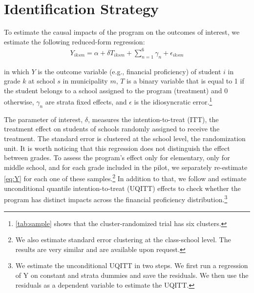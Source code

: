 \section{Identification Strategy} \label{sec:identification}

To estimate the causal impacts of the program on the outcomes of interest, we estimate the following reduced-form regression:
\begin{align} 
     Y_{iksm}= \alpha + \delta T_{iksm} + \sum_{n=1}^{6} \gamma_n  + \epsilon_{iksm} 
     \label{eq:Y}
\end {align}

\noindent

in which $Y$ is the outcome variable (e.g., financial proficiency) of student $i$ in grade $k$ at school $s$ in municipality $m$, $T$ is a binary variable that is equal to 1 if the student belongs to a school assigned to the program (treatment) and 0 otherwise, $\gamma_n$ are strata fixed effects, and $\epsilon$ is the idiosyncratic error.\footnote{\autoref{tab:sample} shows that the cluster-randomized trial has six clusters.}

The parameter of interest, $\delta$, measures the intention-to-treat (ITT), the treatment effect on students of schools randomly assigned to receive the treatment. The standard error is clustered at the school level, the randomization unit. It is worth noticing that this regression does not distinguish the effect between grades. To assess the program's effect only for elementary, only for middle school, and for each grade included in the pilot, we separately re-estimate \autoref{eq:Y} for each one of these samples.\footnote {We also estimate standard error clustering at the class-school level. The results are very similar and are available upon request.} In addition to that, we follow \cite{firpo2009unconditional} and estimate unconditional quantile intention-to-treat (UQITT) effects to check whether the program has distinct impacts across the financial proficiency distribution.\footnote{We estimate the unconditional UQITT in two steps. We first run a regression of Y on constant and strata dummies and save the residuals. We then use the residuals as a dependent variable to estimate the UQITT.} 

